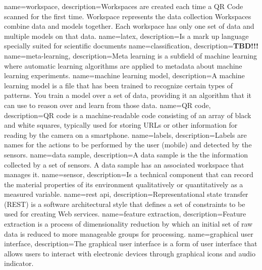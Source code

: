 {
    name={workspace},
    description={Workspaces are created each time a QR Code scanned for the first time. Workspace represents the data collection Workspaces combine data and models together. Each workspace has only one set of data and multiple models on that data.
    }
}
{
    name={latex},
    description={Is a mark up language specially suited for scientific documents}
}
{
    name={classification},
    description={\textbf{TBD!!!}}
}
{
    name={meta-learning},
    description={Meta learning is a subfield of machine learning where automatic learning algorithms are applied to metadata about machine learning experiments.}
}
{
    name={machine learning model},
    description={A machine learning model is a file that has been trained to recognize certain types of patterns. You train a model over a set of data, providing it an algorithm that it can use to reason over and learn from those data.}
}
{
    name={QR code},
    description={QR code is a machine-readable code consisting of an array of black and white squares, typically used for storing URLs or other information for reading by the camera on a smartphone.}
}
{
    name={labels},
    description={Labels are names for the actions to be performed by the user (mobile) and detected by the sensors.}
}
{
    name={data sample},
    description={A data sample is the the information collected by a set of sensors. A data sample has an associated workspace that manages it.}
}
{
    name={sensor},
    description={Is a technical component that can record the material properties of its environment qualitatively or quantitatively as a measured variable.}
}
{
    name={rest api},
    description={Representational state transfer (REST) is a software architectural style that defines a set of constraints to be used for creating Web services.}
}
{
    name={feature extraction},
    description={Feature extraction is a process of dimensionality reduction by which an initial set of raw data is reduced to more manageable groups for processing.}
}
{
    name={graphical user interface},
    description={The graphical user interface is a form of user interface that allows users to interact with electronic devices through graphical icons and audio indicator.}
}

